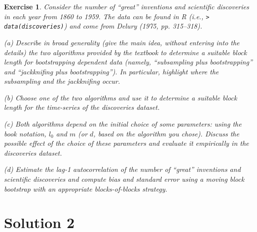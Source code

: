\documentclass[a4paper,12pt]{article}
\theoremstyle{breaktheorem}
\theoremstyle{exerciseStyle}
\newtheorem{exercise}{Exercise}[section]
\theoremstyle{solutionStyle}
\begin{document}
\begin{exercise}{2}
    Consider the number of ``great'' inventions and scientific discoveries in each year from 1860 to 1959. The data can be found in R (i.e., \texttt{> data(discoveries)}) and come from Delury (1975, pp. 315--318).

    \bigskip

    (a) \quad Describe in broad generality (give the main idea, without entering into the details) the two algorithms provided by the textbook to determine a
    suitable block length for bootstrapping dependent data (namely,
    ``subsampling plus bootstrapping'' and ``jackknifing plus bootstrapping''). In particular, highlight where the \emph{subsampling} and the \emph{jackknifing} occur.

    \bigskip

    (b) Choose one of the two algorithms and use it to determine a suitable block length for the time-series of the discoveries dataset.

    \smallskip

    (c) Both algorithms depend on the initial choice of some parameters: using the book notation, $l_0$ and $m$ (or $d$, based on the algorithm you chose). Discuss the possible effect of the choice of these parameters and evaluate it empirically in the discoveries dataset.

    \bigskip

    (d) \quad Estimate the lag-1 autocorrelation of the number of ``great'' inventions and scientific discoveries and compute bias and standard error using a moving block bootstrap with an appropriate blocks-of-blocks strategy.


\end{exercise}

\section*{Solution 2}
\end{document}
